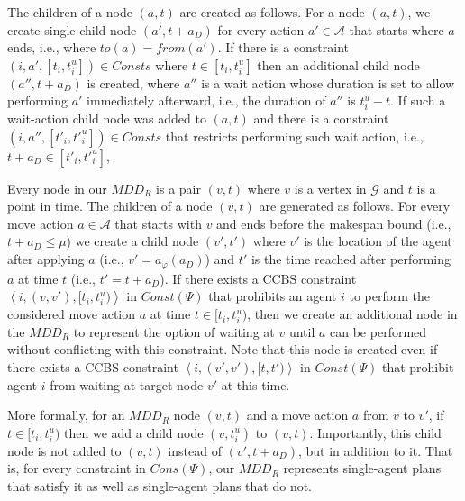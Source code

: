 \documentclass[review]{elsarticle}
\newcommand{\tuple}[1]{\ensuremath{\left \langle #1 \right \rangle }}
\newcommand{\mddr}{\ensuremath{MDD_R}\xspace}
\newcommand{\fromv}{\ensuremath{\mathit{from}}\xspace}
\newcommand{\tov}{\ensuremath{\mathit{to}}\xspace}
\newcommand\konstantin[1]{\nb{\textbf{Konstantin:}}{red}{#1}}
\newcommand\roni[1]{\nb{\textbf{Roni:}}{green}{#1}}
\newcommand\pavel[1]{\nb{\textbf{Pavel:}}{blue}{#1}}
\newcommand{\ccbs}{\ac{CCBS}\xspace}
\begin{document}
The children of a node $(a,t)$ are created as follows. 
For a node $(a,t)$, we create single child node $(a',t+a_D)$ for every action $a'\in\mathcal{A}$ that starts where $a$ ends, i.e., where $\tov(a)=\fromv(a')$. 
If there is a constraint $(i, a', [t_i,t_i^u])\in Consts$ 
where $t\in [t_i,t_i^u]$ then an additional child node $(a'', t+a_D)$ is created, where $a''$ is a wait action whose duration is set to allow performing $a'$ immediately afterward, i.e., the duration of $a''$ is $t_i^u-t$. 
If such a wait-action child node was added to $(a,t)$ 
and there is a constraint 
$(i, a'', [t'_i,{t'}^u_i])\in Consts$ 
that restricts performing such wait action, i.e., $t+a_D\in [t'_i, {t'}_i^u]$, 

Every node in our \mddr is a pair $(v,t)$ where $v$ is a vertex in $\mathcal{G}$ and $t$ is a point in time. 
The children of a node $(v,t)$ are generated as follows. 
For every move action $a\in \mathcal{A}$ %
that starts with $v$ and ends before the makespan bound (i.e., $t+a_D\leq \mu$)
we create a child node $(v',t')$ where 
$v'$ is the location of the agent after applying $a$ (i.e., $v'=a_\varphi(a_D)$) and 
$t'$ is the time reached after performing $a$ at time $t$ (i.e., $t'=t+a_D$). 
If there exists a \ccbs constraint $\tuple{i, (v,v'), [t_i, t_i^u)}$ in $Const(\Psi)$ 
that prohibits an agent $i$ to perform the considered move action $a$ at time $t \in [t_i, t_i^u)$, 
then we create an additional node in the \mddr to represent the option of waiting at $v$ until $a$ can be performed without conflicting with this constraint. 
Note that this node is created even if there exists a \ccbs constraint $\tuple{i, (v',v'), [t, t')}$ in $Const(\Psi)$ that prohibit agent $i$ from waiting at target node $v'$ at this time.


More formally, for an \mddr node $(v,t)$ and a move action $a$ from $v$ to $v'$, if $t\in [t_i, t_i^u)$ then we add a child node $(v,t_i^u)$ to $(v,t)$. Importantly, this child node is not added to $(v,t)$ instead of $(v', t+a_D)$, but in addition to it. 
That is, for every constraint in $Cons(\Psi)$, our \mddr represents single-agent plans that satisfy it as well as single-agent plans that do not. 


\end{document}
